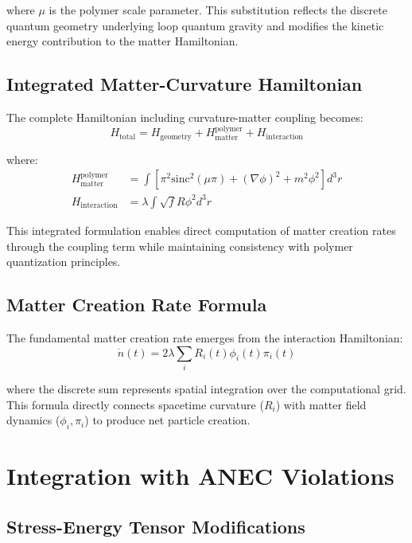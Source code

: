 \documentclass[11pt]{article}
\begin{document}
where $\mu$ is the polymer scale parameter. This substitution reflects the discrete quantum geometry underlying loop quantum gravity and modifies the kinetic energy contribution to the matter Hamiltonian.

\subsection{Integrated Matter-Curvature Hamiltonian}

The complete Hamiltonian including curvature-matter coupling becomes:
\begin{equation}
H_{\text{total}} = H_{\text{geometry}} + H_{\text{matter}}^{\text{polymer}} + H_{\text{interaction}}
\end{equation}

where:
\begin{align}
H_{\text{matter}}^{\text{polymer}} &= \int \left[ \pi^2 \text{sinc}^2(\mu \pi) + (\nabla \phi)^2 + m^2 \phi^2 \right] d^3r \\
H_{\text{interaction}} &= \lambda \int \sqrt{f} R \phi^2 d^3r
\end{align}

This integrated formulation enables direct computation of matter creation rates through the coupling term while maintaining consistency with polymer quantization principles.

\subsection{Matter Creation Rate Formula}

The fundamental matter creation rate emerges from the interaction Hamiltonian:
\begin{equation}
\dot{n}(t) = 2\lambda \sum_i R_i(t) \phi_i(t) \pi_i(t)
\end{equation}

where the discrete sum represents spatial integration over the computational grid. This formula directly connects spacetime curvature ($R_i$) with matter field dynamics ($\phi_i, \pi_i$) to produce net particle creation.

\section{Integration with ANEC Violations}

\subsection{Stress-Energy Tensor Modifications}
\end{document}

